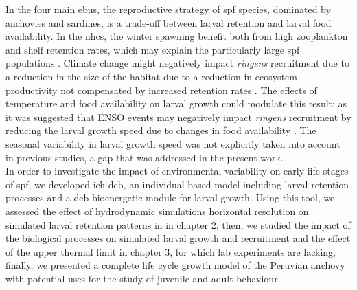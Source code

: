 In the four main \acrfull{ebus}, the reproductive strategy of \acrshort{spf} species, dominated by anchovies and sardines, is a trade-off between larval retention and larval food availability. In the \acrshort{nhcs}, the winter spawning benefit both from high zooplankton and shelf retention rates, which may explain the particularly  large \acrshort{spf} populations \citep{BrocCola2009,BrocLett2011}. Climate change might negatively impact \textit{\gls{ringens}} recruitment due to a reduction in the size of the habitat due to a reduction in ecosystem productivity not compensated by increased retention rates \citep{BrocEche2013}. The effects of temperature and food availability on larval growth could modulate this result; as it was suggested that ENSO events may negatively impact \textit{\gls{ringens}}  recruitment by reducing the larval growth speed due to changes in food availability \citep{XuChai2013,XuRose2015}. The seasonal variability in larval growth speed was not explicitly taken into account in previous studies, a gap that was addressed in the present work.\\

In order to investigate the impact of environmental variability on early life stages of \acrshort{spf}, we developed \gls{ich-deb}, an individual-based model \citep{LettVerl2008} including larval retention processes and a \acrfull{deb} \citep{Kooi2009} bioenergetic module for larval growth. Using this tool, we assessed the effect of hydrodynamic simulations horizontal resolution on simulated larval retention patterns in in chapter 2, then, we studied the impact of the biological processes on simulated larval growth and recruitment and the effect of the upper thermal limit in chapter 3, for which lab experiments are lacking, finally, we presented a complete life cycle growth model of the Peruvian anchovy with potential uses for the study of juvenile and adult behaviour.\\

\clearpage